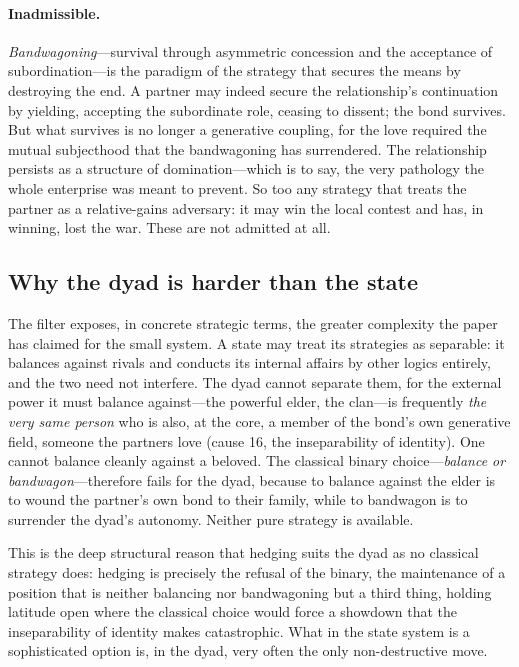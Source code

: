 \paragraph{Inadmissible.} \emph{Bandwagoning}---survival through asymmetric concession and the acceptance of subordination---is the paradigm of the strategy that secures the means by destroying the end. A partner may indeed secure the relationship's continuation by yielding, accepting the subordinate role, ceasing to dissent; the bond survives. But what survives is no longer a generative coupling, for the love required the mutual subjecthood that the bandwagoning has surrendered. The relationship persists as a structure of domination---which is to say, the very pathology the whole enterprise was meant to prevent. So too any strategy that treats the partner as a relative-gains adversary: it may win the local contest and has, in winning, lost the war. These are not admitted at all.

\subsection{Why the dyad is harder than the state}
\label{p17:sub:practices-why}

The filter exposes, in concrete strategic terms, the greater complexity the paper has claimed for the small system. A state may treat its strategies as separable: it balances against rivals and conducts its internal affairs by other logics entirely, and the two need not interfere. The dyad cannot separate them, for the external power it must balance against---the powerful elder, the clan---is frequently \emph{the very same person} who is also, at the core, a member of the bond's own generative field, someone the partners love (cause 16, the inseparability of identity). One cannot balance cleanly against a beloved. The classical binary choice---\emph{balance or bandwagon}---therefore fails for the dyad, because to balance against the elder is to wound the partner's own bond to their family, while to bandwagon is to surrender the dyad's autonomy. Neither pure strategy is available.

This is the deep structural reason that hedging suits the dyad as no classical strategy does: hedging is precisely the refusal of the binary, the maintenance of a position that is neither balancing nor bandwagoning but a third thing, holding latitude open where the classical choice would force a showdown that the inseparability of identity makes catastrophic. What in the state system is a sophisticated option is, in the dyad, very often the only non-destructive move.

